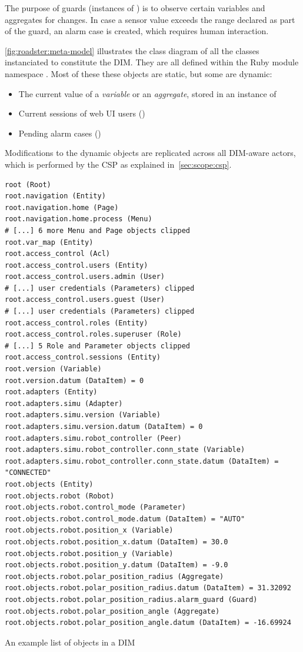 The purpose of guards (instances of ) is to
observe certain variables and aggregates for changes. In case a sensor value
exceeds the range declared as part of the guard, an alarm case is created,
which requires human interaction.


\autoref{fig:roadster:meta-model} illustrates the class diagram of
all the classes instanciated to constitute the DIM. They are all defined within the
Ruby module namespace .
Most of these these objects are static, but some are dynamic:
\begin{itemize}
	\item The current value of a \emph{variable} or an \emph{aggregate}, stored in an instance of \\
	\item Current sessions of web UI users ()
	\item Pending alarm cases ()
\end{itemize}
Modifications to the dynamic objects are replicated across all DIM-aware
actors, which is performed by the \gls{CSP} as explained in~\autoref{sec:scope:csp}.


\begin{listing}
	\begin{verbatim}
root (Root)
root.navigation (Entity)
root.navigation.home (Page)
root.navigation.home.process (Menu)
# [...] 6 more Menu and Page objects clipped
root.var_map (Entity)
root.access_control (Acl)
root.access_control.users (Entity)
root.access_control.users.admin (User)
# [...] user credentials (Parameters) clipped
root.access_control.users.guest (User)
# [...] user credentials (Parameters) clipped
root.access_control.roles (Entity)
root.access_control.roles.superuser (Role)
# [...] 5 Role and Parameter objects clipped
root.access_control.sessions (Entity)
root.version (Variable)
root.version.datum (DataItem) = 0
root.adapters (Entity)
root.adapters.simu (Adapter)
root.adapters.simu.version (Variable)
root.adapters.simu.version.datum (DataItem) = 0
root.adapters.simu.robot_controller (Peer)
root.adapters.simu.robot_controller.conn_state (Variable)
root.adapters.simu.robot_controller.conn_state.datum (DataItem) = "CONNECTED"
root.objects (Entity)
root.objects.robot (Robot)
root.objects.robot.control_mode (Parameter)
root.objects.robot.control_mode.datum (DataItem) = "AUTO"
root.objects.robot.position_x (Variable)
root.objects.robot.position_x.datum (DataItem) = 30.0
root.objects.robot.position_y (Variable)
root.objects.robot.position_y.datum (DataItem) = -9.0
root.objects.robot.polar_position_radius (Aggregate)
root.objects.robot.polar_position_radius.datum (DataItem) = 31.32092
root.objects.robot.polar_position_radius.alarm_guard (Guard)
root.objects.robot.polar_position_angle (Aggregate)
root.objects.robot.polar_position_angle.datum (DataItem) = -16.69924
  \end{verbatim}
  \caption{An example list of objects in a DIM}
  \label{lst:roadster:dim-tree}
\end{listing}


